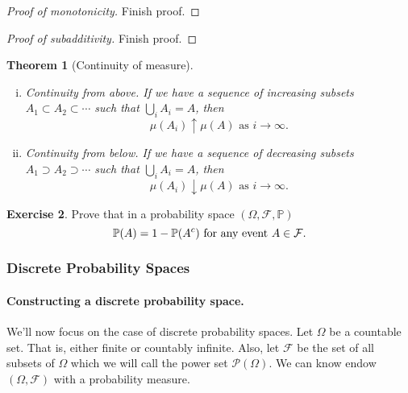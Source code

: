 \documentclass[12pt]{article}
\newcommand{\calF}{\mathcal{F}}
\newcommand{\Prob}{\mathbb{P}}
\newtheorem{thm}{Theorem}[section]
\theoremstyle{definition}
\newtheorem{exer}[thm]{Exercise}
\theoremstyle{remark}
\numberwithin{equation}{section}
\begin{document}
 \begin{proof}[Proof of monotonicity]
   Finish proof. %
 \end{proof}

 \begin{proof}[Proof of subadditivity]
  Finish proof. 
 \end{proof}
 
 \begin{thm}[Continuity of measure]\leavevmode
   \begin{enumerate}[(i)]
     \item \emph{Continuity from above.} If we have a sequence of increasing subsets $A_1 \subset A_2 \subset \cdots $ such that $\bigcup_i A_i = A$, then 
       \begin{equation}
         \mu(A_i) \uparrow \mu(A) \text{ as } i \to \infty.
       \end{equation}
     \item \emph{Continuity from below.} If we have a sequence of decreasing subsets $A_1 \supset A_2 \supset \cdots $ such that $\bigcup_i A_i = A$, then 
       \begin{equation}
         \mu(A_i) \downarrow \mu(A) \text{ as } i \to \infty. 
       \end{equation}
 \end{enumerate}
 \end{thm}

 \begin{exer}
   Prove that in a probability space $(\Omega, \calF, \Prob)$ 
   \begin{equation} 
     \Prob(A) = 1 - \Prob(A^c) \text{ for any event } A \in \cal F.
   \end{equation}
 \end{exer}

\subsubsection*{Discrete Probability Spaces}%
\label{ssub:discrete_probability_spaces}

\paragraph{Constructing a discrete probability space.}

We'll now focus on the case of discrete probability spaces. Let $\Omega$ be a countable set. That is, either finite or countably infinite. Also, let $\calF$ be the set of all subsets of $\Omega$ which we will call the power set $\mathcal{P}(\Omega)$. We can know endow $(\Omega, \calF)$ with a probability measure. 
\end{document}
